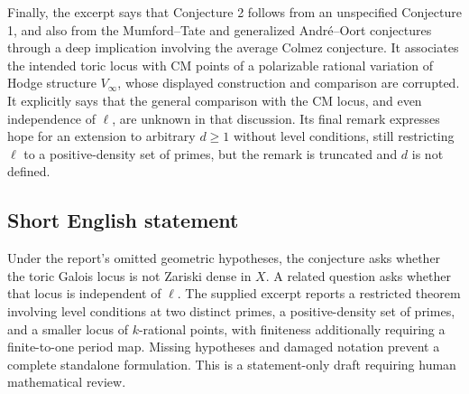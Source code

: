 \documentclass[11pt]{article}
\begin{document}
Finally, the excerpt says that Conjecture 2 follows from an unspecified Conjecture 1, and also from the Mumford--Tate and generalized Andr\'e--Oort conjectures through a deep implication involving the average Colmez conjecture. It associates the intended toric locus with CM points of a polarizable rational variation of Hodge structure \(V_\infty\), whose displayed construction and comparison are corrupted. It explicitly says that the general comparison with the CM locus, and even independence of \(\ell\), are unknown in that discussion. Its final remark expresses hope for an extension to arbitrary \(d\ge1\) without level conditions, still restricting \(\ell\) to a positive-density set of primes, but the remark is truncated and \(d\) is not defined.
\subsection{Short English statement}
Under the report's omitted geometric hypotheses, the conjecture asks whether the toric Galois locus is not Zariski dense in \(X\). A related question asks whether that locus is independent of \(\ell\). The supplied excerpt reports a restricted theorem involving level conditions at two distinct primes, a positive-density set of primes, and a smaller locus of \(k\)-rational points, with finiteness additionally requiring a finite-to-one period map. Missing hypotheses and damaged notation prevent a complete standalone formulation. This is a statement-only draft requiring human mathematical review.
\end{document}
